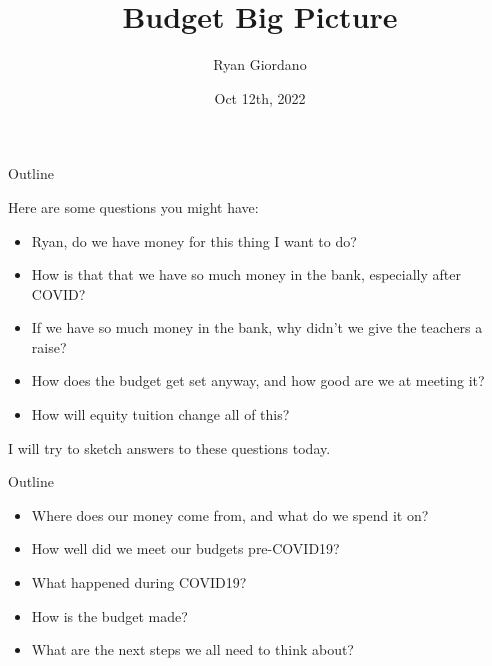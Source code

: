 \documentclass[8pt]{beamer}
\title{Budget Big Picture}
\author{Ryan Giordano}
\date{Oct 12th, 2022}
\institute{Children's Community Center}
\begin{document}

\begin{frame}{Outline}

Here are some questions you might have:
%
\begin{itemize}
%
\item Ryan, do we have money for this thing I want to do?
\item How is that that we have so much money in the bank, especially after COVID?
\item If we have so much money in the bank, why didn't we give the teachers
    a raise?
\item How does the budget get set anyway, and how good are we at meeting it?
\item How will equity tuition change all of this?
%
\end{itemize}
%
I will try to sketch answers to these questions today.
%
\end{frame}



\begin{frame}{Outline}

%
\begin{itemize}
%
\item Where does our money come from, and what do we spend it on?
\item How well did we meet our budgets pre-COVID19?
\item What happened during COVID19?
\item How is the budget made?
\item What are the next steps we all need to think about?
%
\end{itemize}
%

\end{frame}
\end{document}
